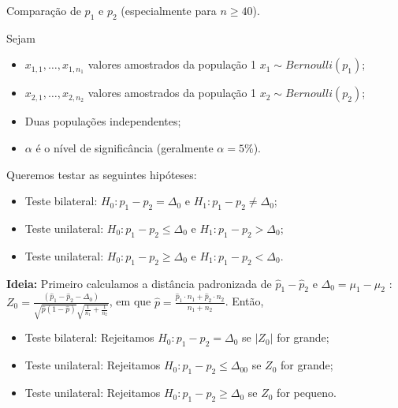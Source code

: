 \documentclass[9pt]{beamer}
\begin{document}
\begin{frame}{Comparação de $p_1$ e $p_2$ (especialmente para $n \geq 40$).}

\normalsize
Sejam
\begin{itemize}
	\item $x_{1,1}, \dots, x_{1, n_1}$ valores amostrados da população 1 $x_1 \sim Bernoulli(p_1)$;
	\item $x_{2,1}, \dots, x_{2, n_2}$ valores amostrados da população 1 $x_2 \sim Bernoulli(p_2)$;
	\item Duas populações independentes;
	\item $\alpha$ é o nível de significância (geralmente $\alpha=5\%$). 
\end{itemize}
\vfill

Queremos testar as seguintes hipóteses:
\begin{itemize}
	\item Teste bilateral: $H_0: p_1 - p_2 = \Delta_0$ e $H_1: p_1 - p_2 \neq \Delta_0$;
	\item Teste unilateral: $H_0: p_1 - p_2 \leq \Delta_0$ e $H_1: p_1 - p_2 > \Delta_0$;
	\item Teste unilateral: $H_0: p_1 - p_2 \geq \Delta_0$ e $H_1: p_1 - p_2 < \Delta_0$.
\end{itemize}
\vfill

\textbf{Ideia:} Primeiro calculamos a distância padronizada de $\hat{p}_1 - \hat{p}_2$ e $\Delta_0=\mu_1 - \mu_2$ : $Z_0 = \frac{(\hat{p}_1 - \hat{p}_2 - \Delta_0)}{\sqrt{\hat{p}(1 - \hat{p})}\sqrt{\frac{1}{n_1} + \frac{1}{n_2}}}$, em que $\hat{p} = \frac{\hat{p}_1 \cdot n_1 + \hat{p}_2 \cdot n_2}{n_1 + n_2}$. Então, 
\begin{itemize}
	\item Teste bilateral: Rejeitamos $H_0: p_1 - p_2 =\Delta_0$ se $\lvert Z_0 \rvert$ for grande;
	\item Teste unilateral: Rejeitamos $H_0: p_1 - p_2 \leq \Delta_00$ se $Z_0 $ for grande;
	\item Teste unilateral: Rejeitamos $H_0: p_1 - p_2 \geq \Delta_0$ se $Z_0 $ for pequeno.
\end{itemize}
\normalsize
\end{frame}
\end{document}
